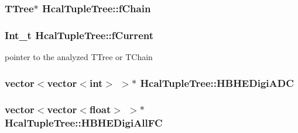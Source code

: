 \subsubsection[{f\+Chain}]{\setlength{\rightskip}{0pt plus 5cm}T\+Tree$\ast$ Hcal\+Tuple\+Tree\+::f\+Chain}\label{class_hcal_tuple_tree_ab2d0b951f1d870277db06338998d359c}
\hypertarget{class_hcal_tuple_tree_a08b8ee5bd18d61d595dabae8738f94f0}{}
\subsubsection[{f\+Current}]{\setlength{\rightskip}{0pt plus 5cm}Int\+\_\+t Hcal\+Tuple\+Tree\+::f\+Current}\label{class_hcal_tuple_tree_a08b8ee5bd18d61d595dabae8738f94f0}


pointer to the analyzed T\+Tree or T\+Chain 

\hypertarget{class_hcal_tuple_tree_aabfac31abb8a835c19bc571bdd28632d}{}
\subsubsection[{H\+B\+H\+E\+Digi\+A\+D\+C}]{\setlength{\rightskip}{0pt plus 5cm}vector$<$vector$<$int$>$ $>$$\ast$ Hcal\+Tuple\+Tree\+::\+H\+B\+H\+E\+Digi\+A\+D\+C}\label{class_hcal_tuple_tree_aabfac31abb8a835c19bc571bdd28632d}
\hypertarget{class_hcal_tuple_tree_a5dc5cdeb59f28eaa2308daa56474c892}{}
\subsubsection[{H\+B\+H\+E\+Digi\+All\+F\+C}]{\setlength{\rightskip}{0pt plus 5cm}vector$<$vector$<$float$>$ $>$$\ast$ Hcal\+Tuple\+Tree\+::\+H\+B\+H\+E\+Digi\+All\+F\+C}\label{class_hcal_tuple_tree_a5dc5cdeb59f28eaa2308daa56474c892}
\hypertarget{class_hcal_tuple_tree_a300d8be67219f5369ac7ce004f95b554}{}
